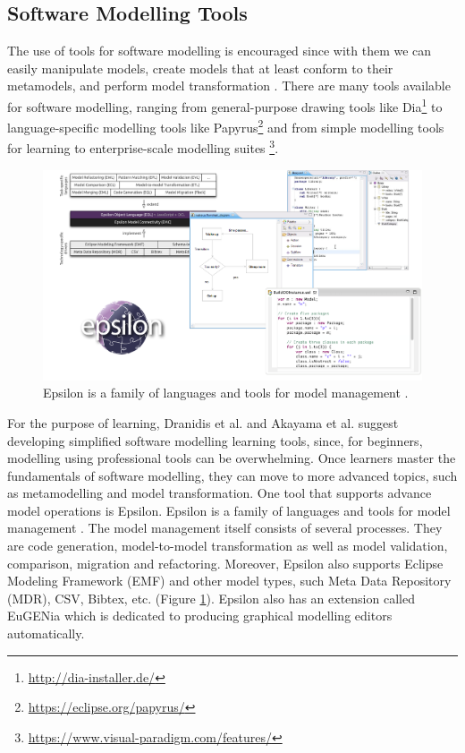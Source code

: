\documentclass[12pt, a4paper]{report}
\begin{document}
{\subsection{Software Modelling Tools}
The use of tools for software modelling is encouraged since with them we can easily manipulate models, create models that at least conform to their metamodels, and perform model transformation \cite{brambilla2012model}. There are many tools available for software modelling, ranging from general-purpose drawing tools like Dia\footnote{\url{http://dia-installer.de/}} to language-specific modelling tools like Papyrus\footnote{\url{https://eclipse.org/papyrus/}} and from  simple modelling tools for learning \cite{dranidis2015learning} to enterprise-scale modelling suites \footnote{\url{https://www.visual-paradigm.com/features/}}. 

\begin{figure}[!ht]
\centering
\includegraphics[width=\textwidth]{epsilon}
\caption{Epsilon is a family of languages and tools for model management \cite{kolovos2010epsilon}.}
\label{epsilon}
\end{figure}

For the purpose of learning, Dranidis et al. \cite{dranidis2015learning} and Akayama et al. \cite{Akayama2013} suggest developing simplified software modelling learning tools, since, for beginners, modelling using professional tools can be overwhelming. Once learners master the fundamentals of software modelling, they can move to more advanced topics, such as metamodelling and model transformation. One tool that supports advance model operations is Epsilon. Epsilon is a family of languages and tools for model management \cite{kolovos2010epsilon}. The model management itself consists of several processes. They are code generation, model-to-model transformation as well as model validation, comparison, migration and refactoring. Moreover, Epsilon also supports Eclipse Modeling Framework (EMF) and other model types, such Meta Data Repository (MDR), CSV, Bibtex, etc. (Figure \ref{epsilon}). Epsilon also has an extension called EuGENia which is dedicated to producing graphical modelling editors automatically\cite{kolovos2015eugenia}.

}
\end{document}
